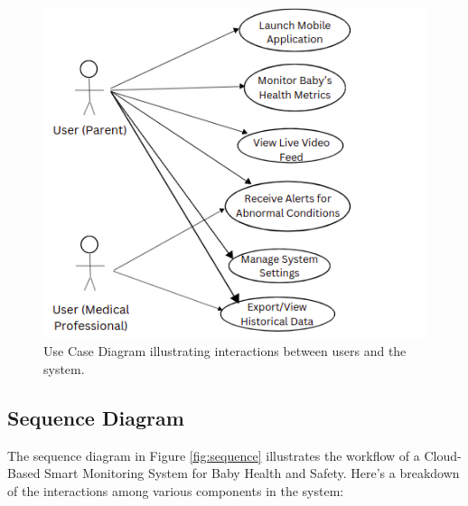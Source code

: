 \documentclass[12pt,a4paper]{report}
\begin{document}
\begin{figure}[hbtp]
  \centering
  \includegraphics[scale=0.6]{./pic/usercase.png}
  \caption{Use Case Diagram illustrating interactions between users and the system.}
  \label{fig:usecase}
\end{figure}

\subsection{Sequence Diagram}
The sequence diagram in Figure \ref{fig:sequence} illustrates the workflow of a Cloud-Based Smart Monitoring System for Baby Health and Safety. Here’s a breakdown of the interactions among various components in the system:
\end{document}
